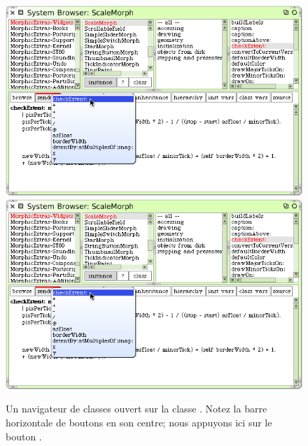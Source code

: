 \documentclass[a4paper,10pt,twoside]{book}
\begin{document}
\begin{figure}[htbp]
	\begin{center}
   \ifluluelse
		{\includegraphics[width=\textwidth]{SendersOfCheckEvent}}
		{\includegraphics[scale=0.7]{SendersOfCheckEvent}}
	\end{center}
	\caption{Un navigateur de classes ouvert sur la classe . Notez la barre horizontale de boutons en son centre; nous appuyons ici sur le bouton .
	\label{fig:SendersOfCheckEvent}}
\end{figure}
\end{document}
